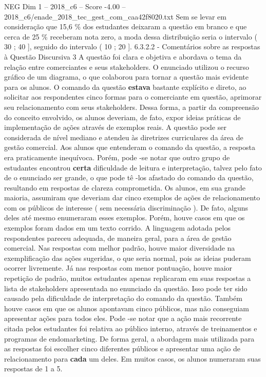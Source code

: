 \begin{textsample}{NEG Dim 1 – 2018\_c6 – Score -4.00 – 2018\_c6/enade\_2018\_tec\_gest\_com\_caa42f8020.txt}
Sem se levar em consideração que 15,6 \% dos estudantes deixaram a questão em branco e que cerca de 25 \% receberam nota zero, a moda dessa distribuição seria o intervalo ( 30 ; 40 ], seguido do intervalo ( 10 ; 20 ]. 6.3.2.2 - Comentários sobre as respostas à Questão Discursiva 3 A questão foi clara e objetiva e abordava o tema da relação entre comerciantes e seus stakeholders.
O enunciado utilizou o recurso gráfico de um diagrama, o que colaborou para tornar a questão mais evidente para os alunos.
O comando da questão \textbf{estava} bastante explícito e direto, ao solicitar aos respondentes cinco formas para o comerciante em questão, aprimorar seu relacionamento com seus stakeholders.
Dessa forma, a partir da compreensão do conceito envolvido, os alunos deveriam, de fato, expor ideias práticas de implementação de ações através de exemplos reais.
A questão pode ser considerada de nível mediano e atendeu às diretrizes curriculares da área de gestão comercial.
Aos alunos que entenderam o comando da questão, a resposta era praticamente inequívoca.
Porém, pode -se notar que outro grupo de estudantes encontrou \textbf{certa} dificuldade de leitura e interpretação, talvez pelo fato de o enunciado ser grande, o que pode tê -los afastado do comando da questão, resultando em respostas de clareza comprometida.
Os alunos, em sua grande maioria, assumiram que deveriam dar cinco exemplos de ações de relacionamento com os públicos de interesse ( sem necessária discriminação ).
De fato, alguns deles até mesmo enumeraram esses exemplos.
Porém, houve casos em que os exemplos foram dados em um texto corrido.
A linguagem adotada pelos respondentes pareceu adequada, de maneira geral, para a área de gestão comercial.
Nas respostas com melhor padrão, houve maior diversidade na exemplificação das ações sugeridas, o que seria normal, pois as ideias puderam ocorrer livremente.
Já nas respostas com menor pontuação, houve maior repetição de padrão, muitos estudantes apenas replicaram em suas respostas a lista de stakeholders apresentada no enunciado da questão.
Isso pode ter sido causado pela dificuldade de interpretação do comando da questão.
Também houve casos em que os alunos apontavam cinco públicos, mas não conseguiam apresentar ações para todos eles.
Pode -se notar que a ação mais recorrente citada pelos estudantes foi relativa ao público interno, através de treinamentos e programas de endomarketing.
De forma geral, a abordagem mais utilizada para as respostas foi escolher cinco diferentes públicos e apresentar uma ação de relacionamento para \textbf{cada} um deles.
Em muitos casos, os alunos numeraram suas respostas de 1 a 5.

\end{textsample}
